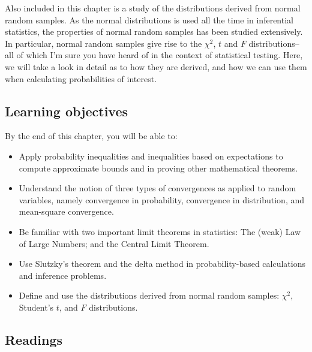 \documentclass[
]{book}
\providecommand{\tightlist}{%
  \setlength{\itemsep}{0pt}\setlength{\parskip}{0pt}}
\theoremstyle{definition}
\theoremstyle{definition}
\theoremstyle{definition}
\theoremstyle{definition}
\theoremstyle{remark}
\begin{document}
Also included in this chapter is a study of the distributions derived from normal random samples.
As the normal distributions is used all the time in inferential statistics, the properties of normal random samples has been studied extensively.
In particular, normal random samples give rise to the \(\chi^2\), \(t\) and \(F\) distributions--all of which I'm sure you have heard of in the context of statistical testing.
Here, we will take a look in detail as to how they are derived, and how we can use them when calculating probabilities of interest.

\hypertarget{learning-objectives-2}{%
\subsection*{Learning objectives}\label{learning-objectives-2}}

By the end of this chapter, you will be able to:

\begin{itemize}
\tightlist
\item
  Apply probability inequalities and inequalities based on expectations to compute approximate bounds and in proving other mathematical theorems.
\item
  Understand the notion of three types of convergences as applied to random variables, namely convergence in probability, convergence in distribution, and mean-square convergence.
\item
  Be familiar with two important limit theorems in statistics: The (weak) Law of Large Numbers; and the Central Limit Theorem.
\item
  Use Slutzky's theorem and the delta method in probability-based calculations and inference problems.
\item
  Define and use the distributions derived from normal random samples: \(\chi^2\), Student's \(t\), and \(F\) distributions.
\end{itemize}

\hypertarget{readings-2}{%
\subsection*{Readings}\label{readings-2}}
\end{document}
